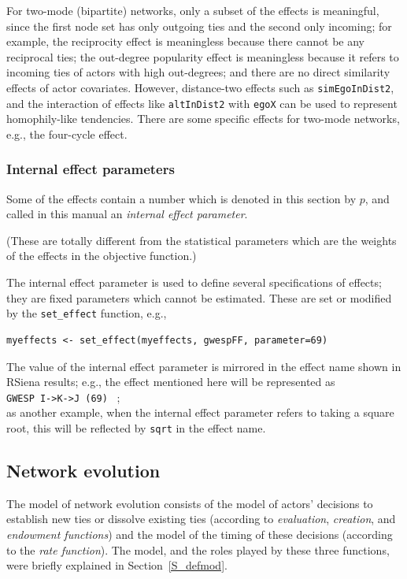 \documentclass[a4paper,fleqn,11pt]{article}
\newcommand{\+}{\, + \,}
\newcommand{\RS}{{\sf \textsf{RSiena} }}
\begin{document}
For two-mode (bipartite) networks, only a subset of the effects is
meaningful, since the first node set has only outgoing ties
and the second only incoming; for example, the reciprocity effect
is meaningless because there cannot be any reciprocal ties;
the out-degree popularity effect is meaningless because it refers to
incoming ties of actors with high out-degrees; and there are no direct
similarity effects of actor covariates. However, distance-two effects
such as \texttt{simEgoInDist2}, and the interaction of effects like
\texttt{altInDist2} with \texttt{egoX} can be used to represent
homophily-like tendencies.
There are some specific effects for two-mode networks, e.g.,
the four-cycle effect.


\subsubsection{Internal effect parameters}
\label{S_effpar}

\hypertarget{T_effpar}{
Some of the effects contain a number which is denoted in this section
by $p$, and called in this manual an \emph{internal effect parameter}.
}
(These are totally different from the statistical parameters which are
the weights of the effects in the objective function.)

The internal effect parameter is used to define several
specifications of effects; they are fixed parameters
which cannot be estimated.
These are set or modified by the \texttt{set\_effect} function, e.g.,
\begin{verbatim}
myeffects <- set_effect(myeffects, gwespFF, parameter=69)
\end{verbatim}
The value of the internal effect parameter is mirrored in the
effect name shown in \RS results; e.g., the effect mentioned here
will be represented as\\
\texttt{GWESP I->K->J (69)} \ ;\\
as another example, when the internal effect parameter refers to taking a square root,
this will be reflected by \texttt{sqrt} in the effect name.


\subsection{Network evolution}
The model of network evolution consists of the model of actors'
decisions to establish new ties or dissolve existing ties
(according to {\it evaluation}, {\it creation},
and {\it endowment functions}) and the
model of the timing of these decisions (according to the {\it rate
function}).
The model, and the roles played by these three functions,
were briefly explained in Section~\ref{S_defmod}.
\end{document}
